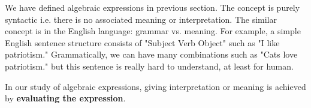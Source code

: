 \documentclass{amsart}
\theoremstyle{definition}
\newcommand{\term}[1]{\textbf{#1}}
\begin{document}
We have defined algebraic expressions in previous section. The concept is purely syntactic i.e. there is no associated meaning or interpretation. The similar concept is in the English language: grammar vs. meaning. For example, a simple English sentence structure consists of "Subject Verb Object" such as "I like patriotism." Grammatically, we can have many combinations such as "Cats love patriotism." but this sentence is really hard to understand, at least for human.

In our study of algebraic expressions, giving interpretation or meaning is achieved by \term{evaluating the expression}.
\end{document}
